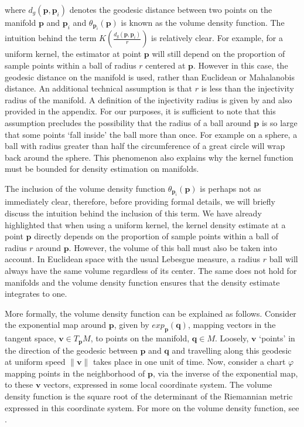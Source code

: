 \documentclass[11pt,a4paper,]{article}
\begin{document}
where \(d_g(\pmb{p}, \pmb{p}_i)\) denotes the geodesic distance between two points on the manifold \(\pmb{p}\) and \(\pmb{p}_i\) and \(\theta_{\pmb{p}_i}(\pmb{p})\) is known as the volume density function. The intuition behind the term \(K\left(\frac{d_g(\pmb{p}, \pmb{p}_i)}{r}\right)\) is relatively clear. For example, for a uniform kernel, the estimator at point \(\pmb{p}\) will still depend on the proportion of sample points within a ball of radius \(r\) centered at \(\pmb{p}\). However in this case, the geodesic distance on the manifold is used, rather than Euclidean or Mahalanobis distance. An additional technical assumption is that \(r\) is less than the injectivity radius of the manifold. A definition of the injectivity radius is given by \textcite{Chavel2006-mp} and also provided in the appendix. For our purposes, it is sufficient to note that this assumption precludes the possibility that the radius of a ball around \(\pmb{p}\) is so large that some points `fall inside' the ball more than once. For example on a sphere, a ball with radius greater than half the circumference of a great circle will wrap back around the sphere. This phenomenon also explains why the kernel function must be bounded for density estimation on manifolds.

The inclusion of the volume density function \(\theta_{\pmb{p}_i}(\pmb{p})\) is perhaps not as immediately clear, therefore, before providing formal details, we will briefly discuss the intuition behind the inclusion of this term. We have already highlighted that when using a uniform kernel, the kernel density estimate at a point \(\pmb{p}\) directly depends on the proportion of sample points within a ball of radius \(r\) around \(\pmb{p}\). However, the volume of this ball must also be taken into account. In Euclidean space with the usual Lebesgue measure, a radius \(r\) ball will always have the same volume regardless of its center. The same does not hold for manifolds and the volume density function ensures that the density estimate integrates to one.

More formally, the volume density function can be explained as follows. Consider the exponential map around \(\pmb{p}\), given by \(exp_{\pmb{p}}(\pmb{q})\), mapping vectors in the tangent space, \(\pmb{v}\in T_{\pmb{p}}M\), to points on the manifold, \(\pmb{q}\in M\). Loosely, \(\pmb{v}\) `points' in the direction of the geodesic between \(\pmb{p}\) and \(\pmb{q}\) and travelling along this geodesic at uniform speed \(\|\pmb{v}\|\) takes place in one unit of time. Now, consider a chart \(\varphi\) mapping points in the neighborhood of \(\pmb{p}\), via the inverse of the exponential map, to these \(\pmb{v}\) vectors, expressed in some local coordinate system. The volume density function is the square root of the determinant of the Riemannian metric expressed in this coordinate system. For more on the volume density function, see \textcite{Le_Brigant2019-lj}.
\end{document}
